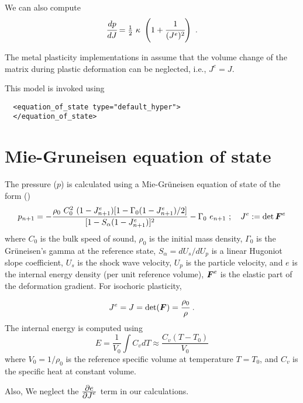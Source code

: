 We can also compute
\begin{equation}
  \cfrac{dp}{dJ} = \tfrac{1}{2}~\kappa~\left(1 + \cfrac{1}{(J^e)^2}\right) ~.
\end{equation}

The metal plasticity implementations in \Vaango assume that the volume
change of the matrix during plastic deformation can be neglected, i.e., $J^e = J$.

This model is invoked using
\lstset{language=XML}
\begin{lstlisting}
  <equation_of_state type="default_hyper">
  </equation_of_state>
\end{lstlisting}

\section{Mie-Gruneisen equation of state}
The pressure ($p$) is calculated using a Mie-Gr{\"u}neisen equation of state 
of the form (\cite{Wilkins1999,Zocher2000})
\begin{equation} \label{eq:EOSMG_upd}
  p_{n+1} =  - \frac{\rho_0~C_0^2~(1 - J^e_{n+1})
           [1 - \Gamma_0 (1 - J^e_{n+1})/2]}
           {[1 - S_{\alpha}(1 - J^e_{n+1})]^2} - \Gamma_0~e_{n+1} 
  ~;~~~ J^e := \det{\ensuremath{\boldsymbol{F}}^e} 
\end{equation}
where $C_0$ is the bulk speed of sound, $\rho_0$ is the initial mass density,
$\Gamma_0$ is the Gr{\"u}neisen's gamma at the reference state,
$S_{\alpha} = dU_s/dU_p$ is a linear Hugoniot slope coefficient,
$U_s$ is the shock wave velocity, $U_p$ is the particle velocity, and
$e$ is the internal energy density (per unit reference volume), $\boldsymbol{F}^e$ is
the elastic part of the deformation gradient.  For isochoric plasticity,
\begin{equation*}
  J^e = J = \det(\boldsymbol{F}) = \cfrac{\rho_0}{\rho} ~.
\end{equation*}
  The internal energy is computed using
  \begin{equation}
    E = \frac{1}{V_0} \int C_v dT \approx \frac{C_v (T-T_0)}{V_0}
  \end{equation}
  where $V_0 = 1/\rho_0$ is the reference specific volume at temperature 
  $T = T_0$, and $C_v$ is the specific heat at constant volume.

Also,
\Beq
\Eeq
We neglect the $\frac{\displaystyle\partial e}{\displaystyle\partial J^e}$ term in our calculations.

